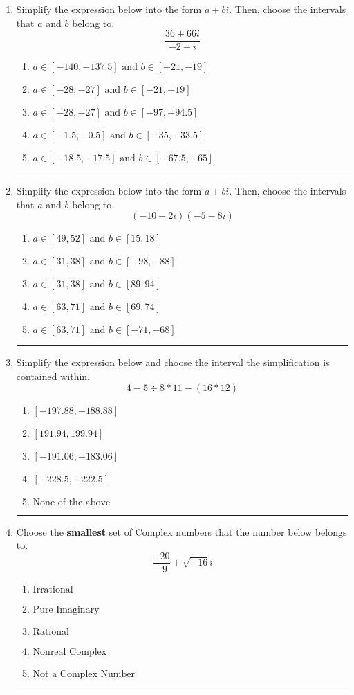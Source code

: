 \documentclass[14pt]{extbook}
\newcommand{\litem}[1]{\item#1\hspace*{-1cm}\rule{\textwidth}{0.4pt}}
\begin{document}
\begin{enumerate}
\litem{
Simplify the expression below into the form $a+bi$. Then, choose the intervals that $a$ and $b$ belong to.\[ \frac{36 + 66 i}{-2 - i} \]\begin{enumerate}[label=\Alph*.]
\item \( a \in [-140, -137.5] \text{ and } b \in [-21, -19] \)
\item \( a \in [-28, -27] \text{ and } b \in [-21, -19] \)
\item \( a \in [-28, -27] \text{ and } b \in [-97, -94.5] \)
\item \( a \in [-1.5, -0.5] \text{ and } b \in [-35, -33.5] \)
\item \( a \in [-18.5, -17.5] \text{ and } b \in [-67.5, -65] \)

\end{enumerate} }
\litem{
Simplify the expression below into the form $a+bi$. Then, choose the intervals that $a$ and $b$ belong to.\[ (-10 - 2 i)(-5 - 8 i) \]\begin{enumerate}[label=\Alph*.]
\item \( a \in [49, 52] \text{ and } b \in [15, 18] \)
\item \( a \in [31, 38] \text{ and } b \in [-98, -88] \)
\item \( a \in [31, 38] \text{ and } b \in [89, 94] \)
\item \( a \in [63, 71] \text{ and } b \in [69, 74] \)
\item \( a \in [63, 71] \text{ and } b \in [-71, -68] \)

\end{enumerate} }
\litem{
Simplify the expression below and choose the interval the simplification is contained within.\[ 4 - 5 \div 8 * 11 - (16 * 12) \]\begin{enumerate}[label=\Alph*.]
\item \( [-197.88, -188.88] \)
\item \( [191.94, 199.94] \)
\item \( [-191.06, -183.06] \)
\item \( [-228.5, -222.5] \)
\item \( \text{None of the above} \)

\end{enumerate} }
\litem{
Choose the \textbf{smallest} set of Complex numbers that the number below belongs to.\[ \frac{-20}{-9}+\sqrt{-16}i \]\begin{enumerate}[label=\Alph*.]
\item \( \text{Irrational} \)
\item \( \text{Pure Imaginary} \)
\item \( \text{Rational} \)
\item \( \text{Nonreal Complex} \)
\item \( \text{Not a Complex Number} \)


\end{enumerate}}
\end{enumerate}
\end{document}
